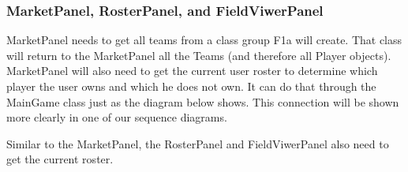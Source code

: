 \documentclass{article}
\begin{document}
\subsubsection{MarketPanel, RosterPanel, and FieldViwerPanel}
MarketPanel needs to get all teams from a class group F1a will create. That class will return to the MarketPanel all the Teams (and therefore all Player objects). MarketPanel will also need to get the current user roster to determine which player the user owns and which he does not own. It can do that through the MainGame class just as the diagram below shows. This connection will be shown more clearly in one of our sequence diagrams.

Similar to the MarketPanel, the RosterPanel and FieldViwerPanel also need to get the current roster.

\end{document}
